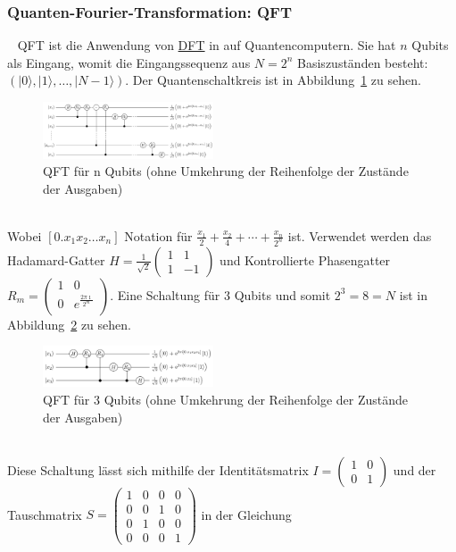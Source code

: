 \subsubsection{\textbf{Quanten-Fourier-Transformation: QFT}}\label{sec:QFT}~\newline
QFT ist die Anwendung von \hyperref[sec:DFT]{DFT} in auf Quantencomputern. Sie hat \(n\) Qubits als Eingang, womit die Eingangssequenz aus \(N = 2^n\) Basiszuständen besteht: \(\left(|0\rangle,|1\rangle,\dots,|N-1\rangle\right)\). Der Quantenschaltkreis ist in Abbildung~\ref{fig:QFT_n_Qubits} zu sehen.
\begin{figure}[hb]
	\centering
	\includegraphics[width=0.45\textwidth]{sections/felix/Q_fourier_nqubits.png}
	\caption{QFT für n Qubits (ohne Umkehrung der Reihenfolge der Zustände der Ausgaben)}
	\label{fig:QFT_n_Qubits}
\end{figure}
\\Wobei \(\left[0.x_1 x_2 \dots x_n\right]\) Notation für \(\frac{x_1}{2}+\frac{x_2}{4}+\cdots+\frac{x_n}{2^n}\) ist.
Verwendet werden das Hadamard-Gatter \(H = \frac{1}{\sqrt{2}}\begin{pmatrix}
	1 &  1\\
	1 & -1
\end{pmatrix}\) und Kontrollierte Phasengatter \(R_m = \begin{pmatrix}
	1 & 0\\
	0 & e^{\frac{2\pi\imath}{2^m}}\\
\end{pmatrix}\).
Eine Schaltung für \(3\) Qubits und somit \(2^3 = 8 = N\) ist in Abbildung~\ref{fig:QFT_3_Qubits} zu sehen.
\begin{figure}[hb]
	\centering
	\includegraphics[width=0.45\textwidth]{sections/felix/Q_fourier_3qubits.png}
	\caption{QFT für 3 Qubits (ohne Umkehrung der Reihenfolge der Zustände der Ausgaben)}
	\label{fig:QFT_3_Qubits}
\end{figure}
\\Diese Schaltung lässt sich mithilfe der Identitätsmatrix \(I = \begin{pmatrix}
	1 & 0 \\
	0 & 1 
\end{pmatrix}\) und der Tauschmatrix \(S = \begin{pmatrix}
	1 & 0 & 0 & 0\\
	0 & 0 & 1 & 0\\
	0 & 1 & 0 & 0\\
	0 & 0 & 0 & 1
\end{pmatrix}\) in der Gleichung
